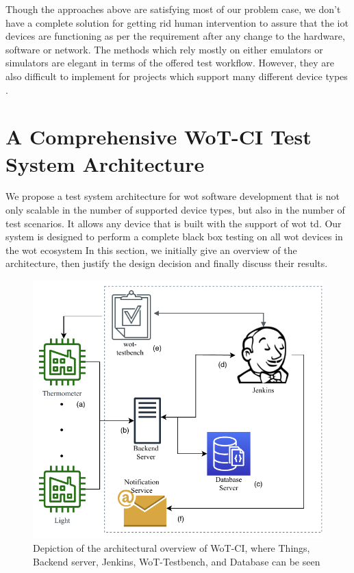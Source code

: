 \documentclass[conference]{IEEEtran}
\theoremstyle{definition}
\begin{document}
Though the approaches above are satisfying most of our problem case, we don’t have a complete solution for getting rid human intervention to assure that the \ac{iot} devices are functioning as per the requirement after any change to the hardware, software or network. 
The methods which rely mostly on either emulators or simulators are elegant in terms of the offered test workflow. 
However, they are also difficult to implement for projects which support many different device types \cite{rosenkranz2015distributed}.

\section{A Comprehensive WoT-CI Test System Architecture}

We propose a test system architecture for \ac{wot} software development that is not only scalable in the number of supported device types, but also in the number of test scenarios. 
It allows any device that is built with the support of \ac{wot} \ac{td}.  
Our system is designed to perform a complete black box testing on all \ac{wot} devices in the \ac{wot} ecosystem
In this section, we initially give an overview of the architecture, then justify the design decision and finally discuss their results.

\begin{figure}[t]
  \centerline{\includegraphics[scale=0.7]{arch} }
  \caption{Depiction of the architectural overview of WoT-CI, where Things, Backend server, Jenkins, WoT-Testbench, and Database can be seen}
  \label{fig:Architecture}
\end{figure}
\end{document}
